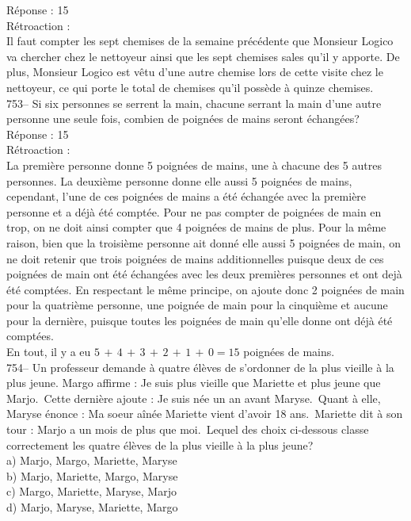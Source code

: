 ﻿\documentclass[letterpaper, 12pt]{article}
\begin{document}
R\'eponse : 15\\

R\'etroaction : \\
Il faut compter les sept chemises de la semaine pr\'ec\'edente que Monsieur
Logico va chercher chez le nettoyeur ainsi que les sept chemises sales qu'il
y apporte. De plus, Monsieur Logico est v\^etu d'une autre chemise lors de
cette visite chez le nettoyeur, ce qui porte le total de chemises qu'il
poss\`ede \`a quinze chemises.\\

753-- Si six personnes se serrent la main, chacune serrant la main d'une
autre personne une seule fois, combien de poign\'ees de mains seront
\'echang\'ees?\\

R\'eponse : 15\\

R\'etroaction : \\
La premi\`ere personne donne 5 poign\'ees de mains, une \`a chacune
des 5 autres personnes. La deuxi\`eme personne donne elle aussi 5
poign\'ees de mains, cependant, l'une de ces poign\'ees de mains a
\'et\'e \'echang\'ee avec la premi\`ere personne et a d\'ej\`a
\'et\'e compt\'ee. Pour ne pas compter de poign\'ees de main en
trop, on ne doit ainsi compter que 4 poign\'ees de mains de plus.
Pour la m\^eme raison, bien que la troisi\`eme personne ait donn\'e
elle aussi 5 poign\'ees de main, on ne doit retenir que trois
poign\'ees de mains additionnelles puisque deux de ces poign\'ees de
main ont \'et\'e \'echang\'ees avec les deux premi\`eres personnes
et ont dej\`a \'et\'e compt\'ees. En respectant le m\^eme principe,
on ajoute donc 2 poign\'ees de main pour la quatri\`eme personne,
une poign\'ee de main pour la cinqui\`eme et aucune pour la
derni\`ere, puisque toutes les poign\'ees de main qu'elle donne ont
d\'ej\`a
\'et\'e compt\'ees.\\
En tout, il y a eu $5\,+\,4\,+\,3\,+\,2\,+\,1\,+\,0=15$ poign\'ees de
mains.\\

754-- Un professeur demande \`a quatre \'el\`eves de s'ordonner de
la plus vieille \`a la plus jeune.  Margo affirme : \og Je suis plus
vieille que Mariette et plus jeune que Marjo.\fg\  Cette derni\`ere
ajoute : \og Je suis n\'ee un an avant Maryse.\fg\  Quant \`a elle,
Maryse \'enonce : \og Ma soeur a\^in\'ee Mariette vient d'avoir 18
ans.\fg\ Mariette dit \`a son tour : \og Marjo a un mois de plus que
moi.\fg\ Lequel des choix ci-dessous classe correctement les
quatre \'el\`eves de la plus vieille \`a la plus jeune?\\
a) Marjo, Margo, Mariette, Maryse\\
b) Marjo, Mariette, Margo, Maryse\\
c) Margo, Mariette, Maryse, Marjo\\
d) Marjo, Maryse, Mariette, Margo\\
\end{document}

